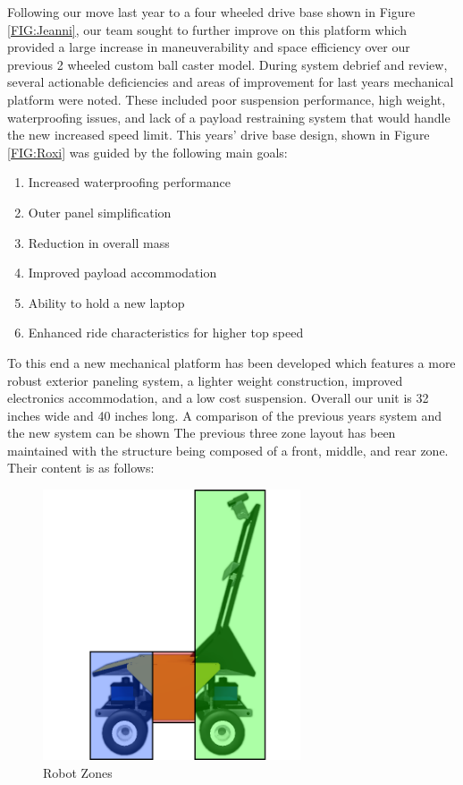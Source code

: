 Following our move last year to a four wheeled drive base shown in Figure \ref{FIG:Jeanni}, our team sought to further improve on this platform which provided a large increase in maneuverability and space efficiency over our previous 2 wheeled custom ball caster model. During system debrief and review, several actionable deficiencies and areas of improvement for last years mechanical platform were noted. These included poor suspension performance, high weight, waterproofing issues, and lack of a payload restraining system that would handle the new increased speed limit. This years' drive base design, shown in Figure \ref{FIG:Roxi} was guided by the following main goals:

\begin{enumerate}
\item Increased waterproofing performance
\item Outer panel simplification
\item Reduction in overall mass
\item Improved payload accommodation
\item Ability to hold a new laptop
\item Enhanced ride characteristics for higher top speed
\end{enumerate}

To this end a new mechanical platform has been developed which features a more robust exterior paneling system, a lighter weight construction, improved electronics accommodation, and a low cost suspension. Overall our unit is 32 inches wide and 40 inches long. A comparison of the previous years system and the new system can be shown The previous three zone layout has been maintained with the structure being composed of a front, middle, and rear zone. Their content is as follows:

\begin{figure}[H]
\begin{center}
\includegraphics[width=3in]{./pics/RobotZones.png}
\caption{Robot Zones}
\label{FIG:Zones}
\end{center}
\end{figure}

